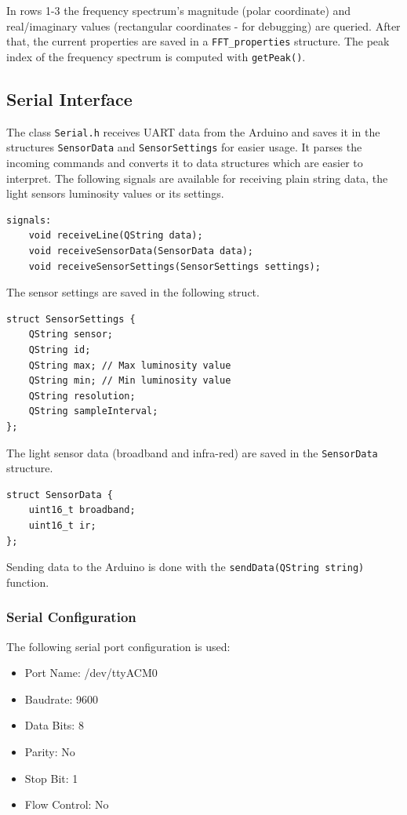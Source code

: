 \documentclass[notitlepage]{scrreprt}
\begin{document}
In rows 1-3 the frequency spectrum's magnitude (polar coordinate) and real/imaginary values (rectangular coordinates - for debugging) are queried. After that, the current properties are saved in a \lstinline{FFT_properties} structure. The peak index of the frequency spectrum is computed with \lstinline{getPeak()}.

\subsection{Serial Interface}
The class \lstinline{Serial.h} receives UART data from the Arduino and saves it in the structures \lstinline{SensorData} and \lstinline{SensorSettings} for easier usage. It parses the incoming commands and converts it to data structures which are easier to interpret. The following signals are available for receiving plain string data, the light sensors luminosity values or its settings.

\begin{lstlisting}
signals:
    void receiveLine(QString data);
    void receiveSensorData(SensorData data);
    void receiveSensorSettings(SensorSettings settings);
\end{lstlisting}

The sensor settings are saved in the following struct.

\begin{lstlisting}
struct SensorSettings {
    QString sensor;
    QString id;
    QString max; // Max luminosity value
    QString min; // Min luminosity value
    QString resolution;
    QString sampleInterval;
};
\end{lstlisting}

The light sensor data (broadband and infra-red) are saved in the \lstinline{SensorData} structure.

\begin{lstlisting}
struct SensorData {
	uint16_t broadband;
	uint16_t ir;
};
\end{lstlisting}

Sending data to the Arduino is done with the \lstinline{sendData(QString string)} function.

\subsubsection{Serial Configuration}
The following serial port configuration is used:
\begin{itemize}
	\item{Port Name: /dev/ttyACM0}
	\item{Baudrate: 9600}
	\item{Data Bits: 8}
	\item{Parity: No}
	\item{Stop Bit: 1}
	\item{Flow Control: No}
\end{itemize}
\end{document}
